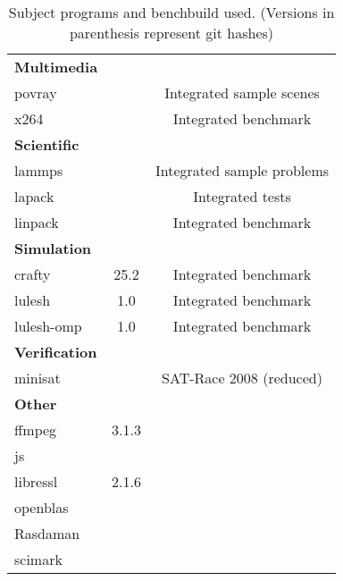\begin{table}[H]
{\begin{minipage}{\textwidth}
\begin{tabularx}{\textwidth}{lcC}
                \midrule
                \textbf{Multimedia}\\
                povray &  & Integrated sample scenes\\
                x264 &  & Integrated benchmark\\
                \midrule
                \textbf{Scientific}\\
                lammps &  & Integrated sample problems\\
                lapack & & Integrated tests\\
                linpack & & Integrated benchmark\\
                \midrule
                \textbf{Simulation}\\
                crafty & 25.2 & Integrated benchmark\\
                lulesh & 1.0 & Integrated benchmark\\
                lulesh-omp & 1.0 & Integrated benchmark\\
                \midrule
                \textbf{Verification}\\
                minisat &  & SAT-Race 2008 (reduced)\\
                \midrule
                \textbf{Other}\\
                ffmpeg & 3.1.3\\
                js\\
                libressl & 2.1.6\\
                openblas & \\
                Rasdaman & \\
                scimark  & \\
                \bottomrule
            \end{tabularx}
            \caption[Subject programs]{Subject programs and benchbuild used. (Versions in parenthesis represent git hashes)}
        \end{minipage}
    }
\end{table}

